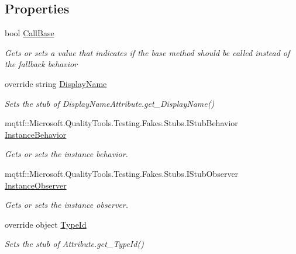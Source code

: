 \subsection*{Properties}
\begin{DoxyCompactItemize}
\item 
bool \hyperlink{class_system_1_1_component_model_1_1_fakes_1_1_stub_display_name_attribute_ab4cf6d7f1184b060852fd5c95c958496}{Call\-Base}
\begin{DoxyCompactList}\small\item\em Gets or sets a value that indicates if the base method should be called instead of the fallback behavior\end{DoxyCompactList}\item 
override string \hyperlink{class_system_1_1_component_model_1_1_fakes_1_1_stub_display_name_attribute_a2c0903d0e2f2f632156c9aca8ff59cc9}{Display\-Name}
\begin{DoxyCompactList}\small\item\em Sets the stub of Display\-Name\-Attribute.\-get\-\_\-\-Display\-Name()\end{DoxyCompactList}\item 
mqttf\-::\-Microsoft.\-Quality\-Tools.\-Testing.\-Fakes.\-Stubs.\-I\-Stub\-Behavior \hyperlink{class_system_1_1_component_model_1_1_fakes_1_1_stub_display_name_attribute_a8991930cc6d37937dfd992d2139c3b49}{Instance\-Behavior}
\begin{DoxyCompactList}\small\item\em Gets or sets the instance behavior.\end{DoxyCompactList}\item 
mqttf\-::\-Microsoft.\-Quality\-Tools.\-Testing.\-Fakes.\-Stubs.\-I\-Stub\-Observer \hyperlink{class_system_1_1_component_model_1_1_fakes_1_1_stub_display_name_attribute_a400f003cc59d2c57e0f45c35d84b252c}{Instance\-Observer}
\begin{DoxyCompactList}\small\item\em Gets or sets the instance observer.\end{DoxyCompactList}\item 
override object \hyperlink{class_system_1_1_component_model_1_1_fakes_1_1_stub_display_name_attribute_a4f60a51b076b89726473f0197f2e6a9e}{Type\-Id}
\begin{DoxyCompactList}\small\item\em Sets the stub of Attribute.\-get\-\_\-\-Type\-Id()\end{DoxyCompactList}\end{DoxyCompactItemize}


